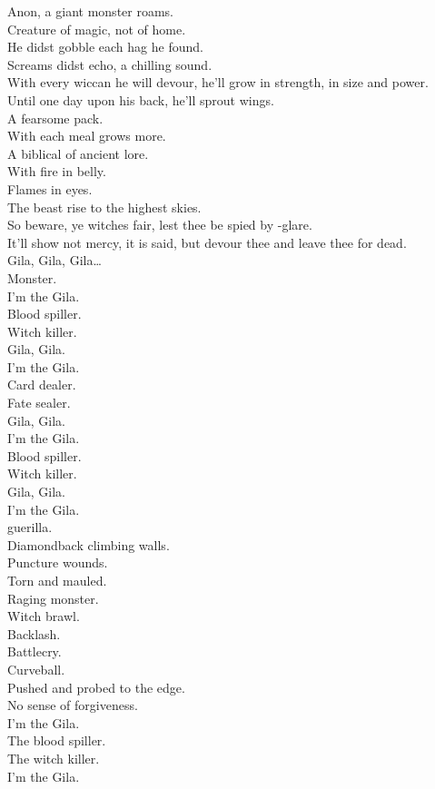 

Anon, a giant monster roams. \\
Creature of magic, not of home. \\
He didst gobble each hag he found. \\
Screams didst echo, a chilling sound. \\
With every wiccan he will devour, he'll grow in strength, in size and power. \\
Until one day upon his back, he'll sprout wings. \\
A fearsome pack. \\
With each meal  grows more. \\
A biblical  of ancient lore. \\
With fire in belly. \\
Flames in eyes. \\
The beast rise to the highest skies. \\
So beware, ye witches fair, lest thee be spied by -glare. \\
It'll show not mercy, it is said, but devour thee and leave thee for dead. \\

Gila, Gila, Gila… \\
Monster. \\

I'm the Gila. \\
Blood spiller. \\
Witch killer. \\
Gila, Gila. \\
I'm the Gila. \\
Card dealer. \\
Fate sealer. \\
Gila, Gila. \\
I'm the Gila. \\
Blood spiller. \\
Witch killer. \\
Gila, Gila. \\
I'm the Gila. \\
 guerilla. \\

Diamondback climbing walls. \\
Puncture wounds. \\
Torn and mauled. \\
Raging monster. \\
Witch brawl. \\
Backlash. \\
Battlecry. \\
Curveball. \\
Pushed and probed to the edge. \\
No sense of forgiveness. \\
I'm the Gila. \\
The blood spiller. \\
The witch killer. \\
I'm the Gila. \\

